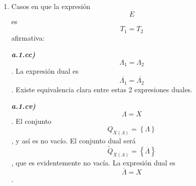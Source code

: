 \documentclass[
]{article}
\begin{document}
\begin{enumerate}
\begin{enumerate}
\begin{enumerate}
\begin{enumerate}
\begin{enumerate}
{          previamente que ver cuál es el dual de un recorrido \textbf{Q}
          en \textbf{B}, que será el conjunto de los elementos de
          \textbf{B} que son inversos de los elementos de \textbf{Q}, ya
          que para cada constante o valor que tome una variable, el dual
          será el dual de esa constante o valor, esto es, el complemento
          de esa constante o valor. Para una variable \textbf{a}, el
          conjunto de valores que recorre es
          \textbf{Q}}\textsubscript{\emph{\textbf{a}}}\emph{ . Si
          necesi\-tamos algún conjunto auxiliar lo llamaremos \textbf{A}
          y se de\-finirá antes de su uso con la idea que no sea
          demasiado engorrosa la escritura. Si un conjunto \textbf{C} es
          sin el 1 lo denotaremos por
          \textbf{C}}\textsubscript{\emph{\textbf{*}}}\emph{ y si es sin
          el 0 lo denotaremos
          \textbf{C}}\textsuperscript{\emph{\textbf{*}}}\emph{ y
          definimos
          \textbf{B}}\textsubscript{\emph{\textbf{2}}}\emph{\textbf{=\{0,1\}}
          y si un conjunto \textbf{C} es sin 0 y sin 1 lo denotamos por
          \textbf{C}}\textsuperscript{\emph{\textbf{X}}}\emph{. Otro
          elemento importante son los paréntesis, que permiten una no
          asociatividad generali\-zada entre las diversas operaciones,
          al no cambiar en absoluto en la expresión dual.}
        \item
          Casos en que la expresión \[E\] es\[T_{1} = T_{2}\]afirmativa:

          \emph{\textbf{a.1.cc)}} \[\Lambda_{1} = \Lambda_{2}\]. La
          expresión dual es
          \[\overline{\Lambda_{1}} = \overline{\Lambda_{2}}\]. Existe
          equivalencia cla\-ra entre estas 2 expresiones duales.

          \emph{\textbf{a.1.cv)}} \[\Lambda = X\]. El conjunto
          \[Q_{X{(\Lambda)}} = \left\{ \Lambda \right\}\] , y así es no
          vacío. El conjunto dual será
          \[{\widetilde{Q}}_{X{(\Lambda)}} = \left\{ \overline{\Lambda} \right\}\],
          que es evidentemente no vacía. La expresión dual es
          \[\overline{\Lambda} = X\].


\end{enumerate}
\end{enumerate}
\end{enumerate}
\end{enumerate}
\end{enumerate}
\end{document}
